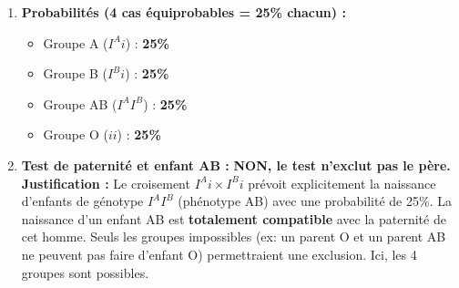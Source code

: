 \documentclass[11pt]{article}
\begin{document}
\begin{exoresolu}
\begin{enumerate}
\begin{center}
\begin{tabular}{|c|c|c|}
        \end{tabular}
    \end{center}
    \item \textbf{Probabilités (4 cas équiprobables = 25\% chacun) :}
    \begin{itemize}
        \item Groupe A ($I^A i$) : \textbf{25\%}
        \item Groupe B ($I^B i$) : \textbf{25\%}
        \item Groupe AB ($I^A I^B$) : \textbf{25\%}
        \item Groupe O ($ii$) : \textbf{25\%}
    \end{itemize}
    \item \textbf{Test de paternité et enfant AB :} \textbf{NON, le test n'exclut pas le père.}
    \textbf{Justification :} Le croisement $I^A i \times I^B i$ prévoit explicitement la naissance d'enfants de génotype $I^A I^B$ (phénotype AB) avec une probabilité de 25\%. La naissance d'un enfant AB est \textbf{totalement compatible} avec la paternité de cet homme. Seuls les groupes impossibles (ex: un parent O et un parent AB ne peuvent pas faire d'enfant O) permettraient une exclusion. Ici, les 4 groupes sont possibles.
\end{enumerate}
\end{exoresolu}
\end{document}
